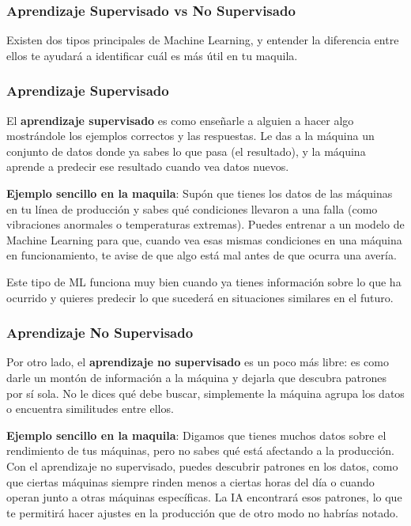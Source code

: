 \documentclass[
  10pt,
  letterpaper,
]{book}
\begin{document}
\subsubsection{\texorpdfstring{\textbf{Aprendizaje Supervisado vs No
Supervisado}}{Aprendizaje Supervisado vs No Supervisado}}\label{aprendizaje-supervisado-vs-no-supervisado}

Existen dos tipos principales de Machine Learning, y entender la
diferencia entre ellos te ayudará a identificar cuál es más útil en tu
maquila.

\subsubsection{\texorpdfstring{\textbf{Aprendizaje
Supervisado}}{Aprendizaje Supervisado}}\label{aprendizaje-supervisado}

El \textbf{aprendizaje supervisado} es como enseñarle a alguien a hacer
algo mostrándole los ejemplos correctos y las respuestas. Le das a la
máquina un conjunto de datos donde ya sabes lo que pasa (el resultado),
y la máquina aprende a predecir ese resultado cuando vea datos nuevos.

\textbf{Ejemplo sencillo en la maquila}: Supón que tienes los datos de
las máquinas en tu línea de producción y sabes qué condiciones llevaron
a una falla (como vibraciones anormales o temperaturas extremas). Puedes
entrenar a un modelo de Machine Learning para que, cuando vea esas
mismas condiciones en una máquina en funcionamiento, te avise de que
algo está mal antes de que ocurra una avería.

Este tipo de ML funciona muy bien cuando ya tienes información sobre lo
que ha ocurrido y quieres predecir lo que sucederá en situaciones
similares en el futuro.

\subsubsection{\texorpdfstring{\textbf{Aprendizaje No
Supervisado}}{Aprendizaje No Supervisado}}\label{aprendizaje-no-supervisado}

Por otro lado, el \textbf{aprendizaje no supervisado} es un poco más
libre: es como darle un montón de información a la máquina y dejarla que
descubra patrones por sí sola. No le dices qué debe buscar, simplemente
la máquina agrupa los datos o encuentra similitudes entre ellos.

\textbf{Ejemplo sencillo en la maquila}: Digamos que tienes muchos datos
sobre el rendimiento de tus máquinas, pero no sabes qué está afectando a
la producción. Con el aprendizaje no supervisado, puedes descubrir
patrones en los datos, como que ciertas máquinas siempre rinden menos a
ciertas horas del día o cuando operan junto a otras máquinas
específicas. La IA encontrará esos patrones, lo que te permitirá hacer
ajustes en la producción que de otro modo no habrías notado.
\end{document}
